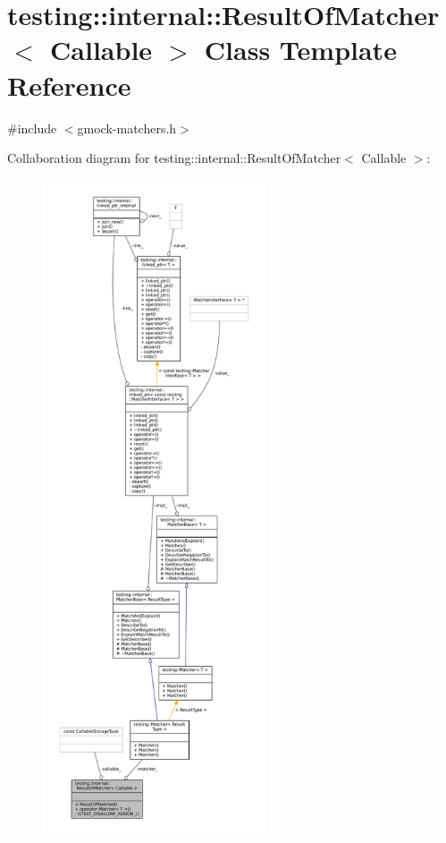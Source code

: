 \hypertarget{classtesting_1_1internal_1_1ResultOfMatcher}{}\section{testing\+:\+:internal\+:\+:Result\+Of\+Matcher$<$ Callable $>$ Class Template Reference}
\label{classtesting_1_1internal_1_1ResultOfMatcher}


{\ttfamily \#include $<$gmock-\/matchers.\+h$>$}



Collaboration diagram for testing\+:\+:internal\+:\+:Result\+Of\+Matcher$<$ Callable $>$\+:
\nopagebreak
\begin{figure}[H]
\begin{center}
\leavevmode
\includegraphics[height=550pt]{classtesting_1_1internal_1_1ResultOfMatcher__coll__graph}
\end{center}
\end{figure}
